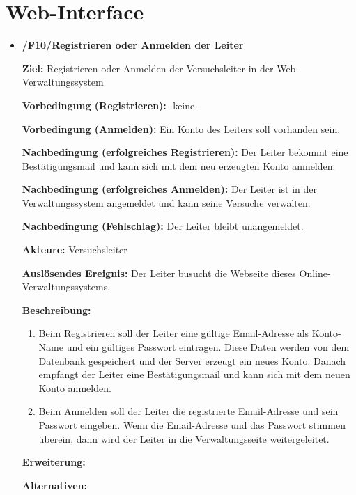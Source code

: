 \documentclass[a4paper]{scrreprt}
\begin{document}
        \section{Web-Interface}
            \begin{itemize}
                \item \textbf{/F10/Registrieren oder Anmelden der Leiter}
        
                    \par \textbf{Ziel: }Registrieren oder Anmelden der Versuchsleiter in der Web-Verwaltungssystem
                    \par \textbf{Vorbedingung (Registrieren): }-keine-
                    \par \textbf{Vorbedingung (Anmelden): }Ein Konto des Leiters soll vorhanden sein.
                    \par \textbf{Nachbedingung (erfolgreiches Registrieren): }Der Leiter bekommt eine Bestätigungsmail und kann sich mit dem neu erzeugten Konto anmelden.
                    \par \textbf{Nachbedingung (erfolgreiches Anmelden): }Der Leiter ist in der Verwaltungssystem angemeldet und kann seine Versuche verwalten.
                    \par \textbf{Nachbedingung (Fehlschlag): }Der Leiter bleibt unangemeldet.
                    \par \textbf{Akteure: }Versuchsleiter
                    \par \textbf{Auslösendes Ereignis: }Der Leiter busucht die Webseite dieses Online-Verwaltungssystems.
                    \par \textbf{Beschreibung: }
                        \begin{enumerate}
                            \item Beim Registrieren soll der Leiter eine gültige Email-Adresse als Konto-Name und ein gültiges Passwort eintragen. Diese Daten werden von dem Datenbank gespeichert und der Server erzeugt ein neues Konto. Danach empfängt der Leiter eine Bestätigungsmail und kann sich mit dem neuen Konto anmelden.
                            \item Beim Anmelden soll der Leiter die registrierte Email-Adresse und sein Passwort eingeben. Wenn die Email-Adresse und das Passwort stimmen überein, dann wird der Leiter in die Verwaltungsseite weitergeleitet.
                        \end{enumerate}
                    \par \textbf{Erweiterung: }
                    \par \textbf{Alternativen: }
                    

\end{itemize}
\end{document}

